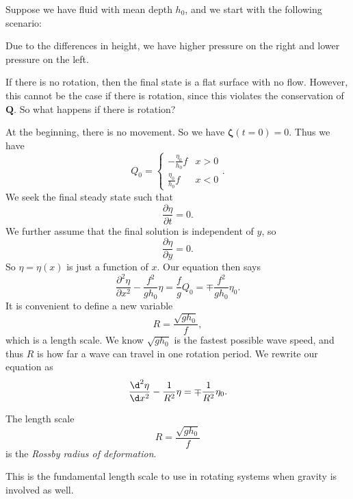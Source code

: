 \documentclass[a4paper]{article}
\begin{document}
\begin{eg}
  Suppose we have fluid with mean depth $h_0$, and we start with the following scenario:
  \begin{center}
  \end{center}
  Due to the differences in height, we have higher pressure on the right and lower pressure on the left.

  If there is no rotation, then the final state is a flat surface with no flow. However, this cannot be the case if there is rotation, since this violates the conservation of $\mathbf{Q}$. So what happens if there is rotation?

  At the beginning, there is no movement. So we have $\boldsymbol\zeta(t = 0) = 0$. Thus we have
  \[
    Q_0 =
    \begin{cases}
      -\frac{\eta_0}{h_0}f & x > 0\\
      \frac{\eta_0}{h_0}f & x < 0
    \end{cases}.
  \]
  We seek the final steady state such that
  \[
    \frac{\partial \eta}{\partial t} = 0.
  \]
  We further assume that the final solution is independent of $y$, so
  \[
    \frac{\partial \eta}{\partial y} = 0.
  \]
  So $\eta = \eta(x)$ is just a function of $x$. Our equation then says
  \[
    \frac{\partial^2 \eta}{\partial x^2} - \frac{f^2}{gh_0} \eta = \frac{f}{g}Q_0 = \mp \frac{f^2}{gh_0}\eta_0.
  \]
  It is convenient to define a new variable
  \[
    R = \frac{\sqrt{gh_0}}{f},
  \]
  which is a length scale. We know $\sqrt{gh_0}$ is the fastest possible wave speed, and thus $R$ is how far a wave can travel in one rotation period. We rewrite our equation as
  \[
    \frac{\d^2 \eta}{\d x^2} - \frac{1}{R^2}\eta = \mp \frac{1}{R^2}\eta_0.
  \]
  \begin{defi}
    The length scale
    \[
      R = \frac{\sqrt{gh_0}}{f}
    \]
    is the \emph{Rossby radius of deformation}.
  \end{defi}
  This is the fundamental length scale to use in rotating systems when gravity is involved as well.


\end{eg}
\end{document}
